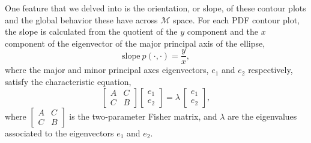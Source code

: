 \documentclass[a4paper,12pt]{article}
\begin{document}
One feature that we delved into is the orientation, or slope, of these contour plots and the global behavior these have across $\mathcal{M}$ space. For each PDF contour plot, the slope is calculated from the quotient of the $y$ component and the $x$ component of the eigenvector of the major principal axis of the ellipse,
\begin{equation}
\text{slope} \ p(\cdot , \cdot) = \frac{y}{x},
\label{eq:slopepdfs}
\end{equation}
where the major and minor principal axes eigenvectors, $e_{1}$ and $e_{2}$ respectively, satisfy the characteristic equation,
\begin{equation}
\begin{bmatrix}
     A & C \\
     C & B        
\end{bmatrix} 
\begin{bmatrix}
     e_{1} \\
     e_{2}         
\end{bmatrix} = \lambda \ 
\begin{bmatrix}
     e_{1} \\
     e_{2}        
\end{bmatrix},
\label{eq:chareq}
\end{equation}
where $\left[ \begin{smallmatrix} A & C \\ C & B \end{smallmatrix} \right]$ is the two-parameter Fisher matrix, and $\lambda$ are the eigenvalues associated to the eigenvectors $e_{1}$ and $e_{2}$. 
\end{document}
